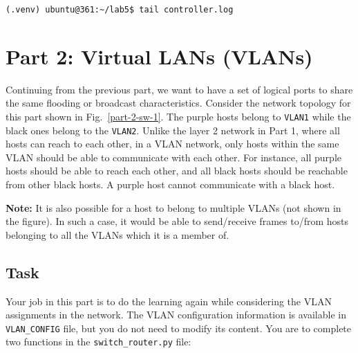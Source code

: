 \documentclass[11pt]{article}
\begin{document}
\begin{lstlisting}[style=ece361shell, caption={Create the network topology for first part}, label={lst:check-controller-logs}]
(.venv) ubuntu@361:~/lab5$ tail controller.log
\end{lstlisting}



\section{Part 2: Virtual LANs (VLANs)}
\label{sec:exercise2}

Continuing from the previous part, we want to have a set of logical ports to share the same flooding or broadcast characteristics.
Consider the network topology for this part shown in Fig.~\ref{part-2-sw-1}.
The purple hosts belong to \texttt{VLAN1} while the black ones belong to the \texttt{VLAN2}.
Unlike the layer 2 network in Part 1, where all hosts can reach to each other, in a VLAN network, only hosts within the same VLAN should be able to communicate with each other.
For instance, all purple hosts should be able to reach each other, and all black hosts should be reachable from other black hosts.
A purple host cannot communicate with a black host.

\textbf{Note:} It is also possible for a host to belong to multiple VLANs (not shown in the figure).
In such a case, it would be able to send/receive frames to/from hosts belonging to all the VLANs which it is a member of.

\subsection{Task}
\label{subsec:logiclearning-vlan}
Your job in this part is to do the learning again while considering the VLAN assignments in the network.
The VLAN configuration information is available in \texttt{VLAN\_CONFIG} file, but you do not need to modify its content.
You are to complete two functions in the \texttt{switch\_router.py} file:
\end{document}
